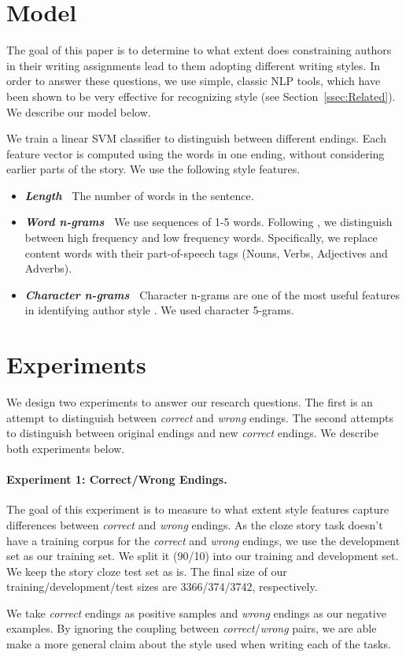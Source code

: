 \documentclass[11pt,a4paper]{article}
\newcommand{\secref}[1]{Section~\ref{ssec:#1}}
\newcommand{\isectionb}[1]{\section{#1}\label{ssec:#1}}
\begin{document}
\isectionb{Model}

The goal of this paper is to determine to what extent does constraining authors in their writing assignments lead to them adopting different writing styles. 
In order to answer these questions, we use simple, classic NLP tools, which have been shown to be very effective for recognizing style (see \secref{Related}).
We describe our model below.

We train a linear SVM classifier to distinguish between different endings. 
Each feature vector is computed using the words in one ending, without considering earlier parts of the story. 
We use the following style features.

\begin{itemize}
\item\textit{\textbf{Length~}} The number of words in the sentence.
\item\textit{\textbf{Word n-grams~}} We use sequences of 1-5 words. Following \cite{Tsur:2010,Schwartz:2013}, we distinguish between high frequency and low frequency words. 
Specifically, we replace content words with their part-of-speech tags (Nouns, Verbs, Adjectives and Adverbs).
\item\textit{\textbf{Character n-grams~}} Character n-grams are one of the most useful features in identifying author style \cite{Stamatatos:2009}. 
We used character 5-grams.
\end{itemize}

\isectionb{Experiments}
We design two experiments to answer our research questions. 
The first is an attempt to distinguish between {\it correct} and {\it wrong} endings.
The second attempts to distinguish between original endings and new {\it correct} endings.
We describe both experiments below.

\paragraph{Experiment 1: Correct/Wrong Endings.}
The goal of this experiment is to measure to what extent  style features capture differences between {\it correct} and {\it wrong} endings.
As the cloze story task doesn't have a training corpus for the {\it correct} and {\it wrong} endings, we use the development set as our training set. 
We split it (90/10) into our training and development set. We keep the story cloze test set as is.
The final size of our training/development/test sizes are 3366/374/3742, respectively. 

We take  {\it correct} endings as positive samples and {\it wrong} endings as our negative examples. 
By ignoring the coupling between {\it correct}/{\it wrong} pairs, we are able make a more general claim about the style used when writing each of the tasks.
\end{document}
